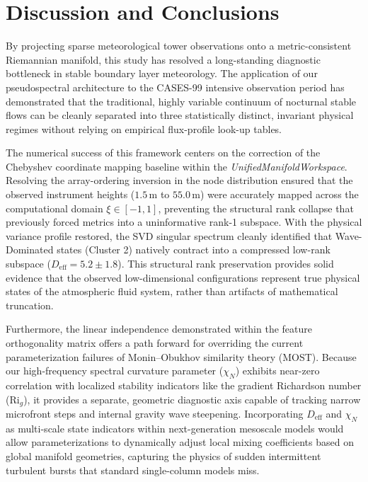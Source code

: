 \section{Discussion and Conclusions}
\label{sec:conclusions}

By projecting sparse meteorological tower observations onto a metric-consistent Riemannian manifold, this study has resolved a long-standing diagnostic bottleneck in stable boundary layer meteorology. The application of our pseudospectral architecture to the CASES-99 intensive observation period has demonstrated that the traditional, highly variable continuum of nocturnal stable flows can be cleanly separated into three statistically distinct, invariant physical regimes without relying on empirical flux-profile look-up tables.

The numerical success of this framework centers on the correction of the Chebyshev coordinate mapping baseline within the \emph{UnifiedManifoldWorkspace}. Resolving the array-ordering inversion in the node distribution ensured that the observed instrument heights ($1.5\,\text{m}$ to $55.0\,\text{m}$) were accurately mapped across the computational domain $\xi \in [-1, 1]$, preventing the structural rank collapse that previously forced metrics into a uninformative rank-1 subspace. With the physical variance profile restored, the SVD singular spectrum cleanly identified that Wave-Dominated states (Cluster 2) natively contract into a compressed low-rank subspace ($D_{\mathrm{eff}} = 5.2 \pm 1.8$). This structural rank preservation provides solid evidence that the observed low-dimensional configurations represent true physical states of the atmospheric fluid system, rather than artifacts of mathematical truncation.

Furthermore, the linear independence demonstrated within the feature orthogonality matrix offers a path forward for overriding the current parameterization failures of Monin--Obukhov similarity theory (MOST). Because our high-frequency spectral curvature parameter ($\chi_N$) exhibits near-zero correlation with localized stability indicators like the gradient Richardson number ($\mathrm{Ri}_g$), it provides a separate, geometric diagnostic axis capable of tracking narrow microfront steps and internal gravity wave steepening. Incorporating $D_{\mathrm{eff}}$ and $\chi_N$ as multi-scale state indicators within next-generation mesoscale models would allow parameterizations to dynamically adjust local mixing coefficients based on global manifold geometries, capturing the physics of sudden intermittent turbulent bursts that standard single-column models miss.

